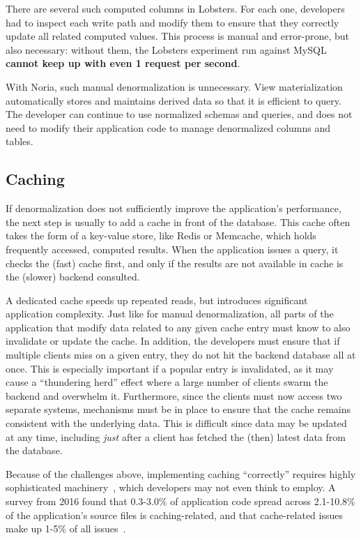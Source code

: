 There are several such computed columns in Lobsters. For each one, developers
had to inspect each write path and modify them to ensure that they correctly
update all related computed values. This process is manual and error-prone, but
also necessary: without them, the Lobsters experiment run against MySQL
\textbf{cannot keep up with even 1 request per second}.

With Noria, such manual denormalization is unnecessary. View materialization
automatically stores and maintains derived data so that it is efficient to
query. The developer can continue to use normalized schemas and queries, and
does not need to modify their application code to manage denormalized columns
and tables.

\subsection{Caching}

If denormalization does not sufficiently improve the application's performance,
the next step is usually to add a cache in front of the database. This cache
often takes the form of a key-value store, like Redis or Memcache, which holds
frequently accessed, computed results. When the application issues a query, it
checks the (fast) cache first, and only if the results are not available in
cache is the (slower) backend consulted.

A dedicated cache speeds up repeated reads, but introduces significant
application complexity. Just like for manual denormalization, all parts of the
application that modify data related to any given cache entry must know to also
invalidate or update the cache. In addition, the developers must ensure
that if multiple clients miss on a given entry, they do not hit the backend
database all at once. This is especially important if a popular entry is
invalidated, as it may cause a ``thundering herd'' effect where a large number
of clients swarm the backend and overwhelm it. Furthermore, since the clients
must now access two separate systems, mechanisms must be in place to ensure that
the cache remains consistent with the underlying data. This is difficult since
data may be updated at any time, including \emph{just} after a client has
fetched the (then) latest data from the database.

Because of the challenges above, implementing caching ``correctly'' requires
highly sophisticated machinery~\cite{facebook-memcache, txcache, orm-cache,
sql-cache}, which developers may not even think to employ. A survey from 2016
found that 0.3-3.0\% of application code spread across 2.1-10.8\% of the
application's source files is caching-related, and that cache-related issues
make up 1-5\% of all issues~\cite{caching-is-hard}.

